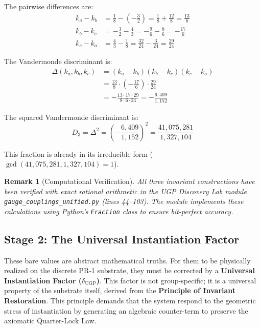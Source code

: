 \documentclass[11pt,twocolumn]{article}
\newtheorem{remark}{Remark}[section]
\begin{document}
The pairwise differences are:
\begin{align}
    k_a - k_b &= \frac{1}{8} - \left(-\frac{3}{2}\right) = \frac{1}{8} + \frac{12}{8} = \frac{13}{8} \\
    k_b - k_c &= -\frac{3}{2} - \frac{4}{3} = -\frac{9}{6} - \frac{8}{6} = -\frac{17}{6} \\
    k_c - k_a &= \frac{4}{3} - \frac{1}{8} = \frac{32}{24} - \frac{3}{24} = \frac{29}{24}
\end{align}

The Vandermonde discriminant is:
\begin{align}
    \Delta(k_a, k_b, k_c) &= (k_a - k_b)(k_b - k_c)(k_c - k_a) \\
    &= \frac{13}{8} \cdot \left(-\frac{17}{6}\right) \cdot \frac{29}{24} \\
    &= -\frac{13 \cdot 17 \cdot 29}{8 \cdot 6 \cdot 24} = -\frac{6{,}409}{1{,}152}
\end{align}

The squared Vandermonde discriminant is:
\begin{equation}
    D_3 = \Delta^2 = \left(-\frac{6{,}409}{1{,}152}\right)^2 = \frac{41{,}075{,}281}{1{,}327{,}104}
\end{equation}

This fraction is already in its irreducible form ($\gcd(41{,}075{,}281, 1{,}327{,}104) = 1$).

\begin{remark}[Computational Verification]
All three invariant constructions have been verified with exact rational arithmetic in the UGP Discovery Lab module \texttt{gauge\_couplings\_unified.py} (lines 44--103). The module implements these calculations using Python's \texttt{Fraction} class to ensure bit-perfect accuracy.
\end{remark}

\subsection{Stage 2: The Universal Instantiation Factor}
These bare values are abstract mathematical truths. For them to be physically realized on the discrete PR-1 substrate, they must be corrected by a \textbf{Universal Instantiation Factor ($\delta_{\text{UGP}}$)}. This factor is not group-specific; it is a universal property of the substrate itself, derived from the \textbf{Principle of Invariant Restoration}. This principle demands that the system respond to the geometric stress of instantiation by generating an algebraic counter-term to preserve the axiomatic Quarter-Lock Law.
\end{document}
